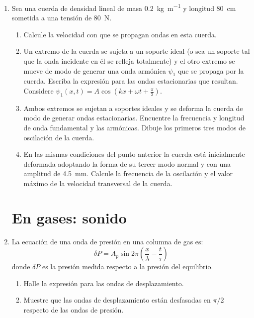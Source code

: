 \documentclass[11pt,spanish,a4paper]{article}
\begin{document}
\begin{enumerate}
\item Sea una cuerda de densidad lineal de masa \SI{0.2}{\kilo\gram\per\metre} y longitud \SI{80}{\centi\metre} sometida a una tensión de \SI{80}{\newton}.
    \begin{enumerate}
	\item Calcule la velocidad con que se propagan ondas en esta cuerda.
	\item Un extremo de la cuerda se sujeta a un soporte ideal (o sea un soporte tal que la onda incidente en él se refleja totalmente) y el otro extremo se mueve de modo de generar una onda armónica \(\psi_1 \) que se propaga por la cuerda. 
	Escriba la expresión para las ondas estacionarias que resultan.
	Considere \(\psi_1(x,t)= A \cos \left( k x + \omega t + \frac{\pi}{2} \right) \).
	\item Ambos extremos se sujetan a soportes ideales y se deforma la cuerda de modo de generar ondas estacionarias.
	Encuentre la frecuencia y longitud de onda fundamental y las armónicas.
	Dibuje los primeros tres modos de oscilación de la cuerda.
	\item En las mismas condiciones del punto anterior la cuerda está inicialmente deformada adoptando la forma de su tercer modo normal y con una amplitud de \SI{4.5}{\milli\metre}.
	Calcule la frecuencia de la oscilación y el valor máximo de la velocidad transversal de la cuerda.
	\end{enumerate}



\section*{En gases: sonido}

\item La ecuación de una onda de presión en una columna de gas es:
	\[
		\delta P= A_p \sin{2 \pi \left( \frac{x }{\lambda }- \frac{t }{\tau } \right) }
	\]
	donde \(\delta P\) es la presión medida respecto a la presión del equilibrio.
    \begin{enumerate}
		\item Halle la expresión para las ondas de desplazamiento.
		\item Muestre que las ondas de desplazamiento están desfasadas en \(\pi/2\) respecto de las ondas de presión.
    \end{enumerate}




\end{enumerate}
\end{document}
